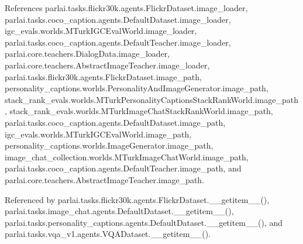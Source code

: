 References parlai.\+tasks.\+flickr30k.\+agents.\+Flickr\+Dataset.\+image\+\_\+loader, parlai.\+tasks.\+coco\+\_\+caption.\+agents.\+Default\+Dataset.\+image\+\_\+loader, igc\+\_\+evals.\+worlds.\+M\+Turk\+I\+G\+C\+Eval\+World.\+image\+\_\+loader, parlai.\+tasks.\+coco\+\_\+caption.\+agents.\+Default\+Teacher.\+image\+\_\+loader, parlai.\+core.\+teachers.\+Dialog\+Data.\+image\+\_\+loader, parlai.\+core.\+teachers.\+Abstract\+Image\+Teacher.\+image\+\_\+loader, parlai.\+tasks.\+flickr30k.\+agents.\+Flickr\+Dataset.\+image\+\_\+path, personality\+\_\+captions.\+worlds.\+Personality\+And\+Image\+Generator.\+image\+\_\+path, stack\+\_\+rank\+\_\+evals.\+worlds.\+M\+Turk\+Personality\+Captions\+Stack\+Rank\+World.\+image\+\_\+path, stack\+\_\+rank\+\_\+evals.\+worlds.\+M\+Turk\+Image\+Chat\+Stack\+Rank\+World.\+image\+\_\+path, parlai.\+tasks.\+coco\+\_\+caption.\+agents.\+Default\+Dataset.\+image\+\_\+path, igc\+\_\+evals.\+worlds.\+M\+Turk\+I\+G\+C\+Eval\+World.\+image\+\_\+path, personality\+\_\+captions.\+worlds.\+Image\+Generator.\+image\+\_\+path, image\+\_\+chat\+\_\+collection.\+worlds.\+M\+Turk\+Image\+Chat\+World.\+image\+\_\+path, parlai.\+tasks.\+coco\+\_\+caption.\+agents.\+Default\+Teacher.\+image\+\_\+path, and parlai.\+core.\+teachers.\+Abstract\+Image\+Teacher.\+image\+\_\+path.



Referenced by parlai.\+tasks.\+flickr30k.\+agents.\+Flickr\+Dataset.\+\_\+\+\_\+getitem\+\_\+\+\_\+(), parlai.\+tasks.\+image\+\_\+chat.\+agents.\+Default\+Dataset.\+\_\+\+\_\+getitem\+\_\+\+\_\+(), parlai.\+tasks.\+personality\+\_\+captions.\+agents.\+Default\+Dataset.\+\_\+\+\_\+getitem\+\_\+\+\_\+(), and parlai.\+tasks.\+vqa\+\_\+v1.\+agents.\+V\+Q\+A\+Dataset.\+\_\+\+\_\+getitem\+\_\+\+\_\+().

